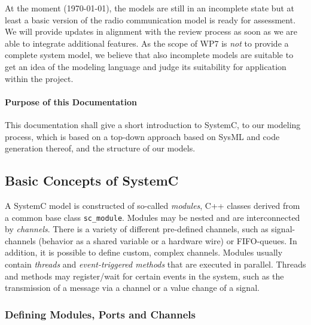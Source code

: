 \documentclass{template/openetcs_article}
\begin{document}
At the moment (\today), the models are still in an incomplete state but at least a basic version of the radio communication model is ready for assessment. We will provide updates in alignment with the review process as soon as we are able to integrate additional features. As the scope of WP7 is \emph{not} to provide a complete system model, we believe that also incomplete models are suitable to get an idea of the modeling language and judge its suitability for application within the project.

\paragraph{Purpose of this Documentation}

This documentation shall give a short introduction to SystemC, to our modeling process, which is based on a top-down approach based on SysML and code generation thereof, and the structure of our models.

\subsection{Basic Concepts of SystemC}

A SystemC model is constructed of so-called \emph{modules}, C++ classes derived from a common base class \texttt{sc\_module}. Modules may be nested and are interconnected by \emph{channels}. There is a variety of different pre-defined channels, such as signal-channels (behavior as a shared variable or a hardware wire) or FIFO-queues. In addition, it is possible to define custom, complex channels. Modules usually contain \emph{threads} and \emph{event-triggered methods} that are executed in parallel. Threads and methods may register/wait for certain events in the system, such as the transmission of a message via a channel or a value change of a signal.

\subsubsection{Defining Modules, Ports and Channels}


\newcommand{\tikzrect}[1]{\draw ($#1+(-0.25,-0.25)$) -- ($#1+(-0.25,+0.25)$) -- ($#1+(+0.25,+0.25)$) -- ($#1+(+0.25,-0.25)$) --cycle;}
\newcommand{\tikzport}[4]{\draw[fill=white] ($#1+(-0.25,-0.25)$) -- ($#1+(-0.25,+0.25)$) -- ($#1+(+0.25,+0.25)$) -- ($#1+(+0.25,-0.25)$) --cycle;
                          \draw[arrows=#2] ($#1+(-0.15,0)$) -- ($#1+(+0.15,0)$);
                          \path ($#1+#3$) node {#4};}
\end{document}
